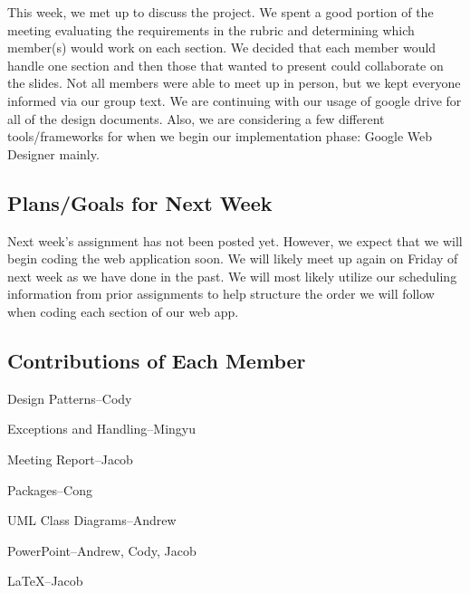 \documentclass[12pt]{article}
\begin{document}
This week, we met up to discuss the project. 
We spent a good portion of the meeting evaluating the requirements in the rubric and determining which member(s) would work on each section. 
We decided that each member would handle one section and then those that wanted to present could collaborate on the slides. 
Not all members were able to meet up in person, but we kept everyone informed via our group text. 
We are continuing with our usage of google drive for all of the design documents. 
Also, we are considering a few different tools/frameworks for when we begin our implementation phase: Google Web Designer mainly.



\subsection{Plans/Goals for Next Week}

Next week’s assignment has not been posted yet. However, we expect that we will begin coding the web application soon. We will likely meet up again on Friday of next week as we have done in the past. We will most likely utilize our scheduling information from prior assignments to help structure the order we will follow when coding each section of our web app.




\subsection{Contributions of Each Member}

\quad Design Patterns--Cody \par
Exceptions and Handling--Mingyu \par
Meeting Report--Jacob \par
Packages--Cong \par
UML Class Diagrams--Andrew \par
PowerPoint--Andrew, Cody, Jacob \par
LaTeX--Jacob

	
\end{document}

